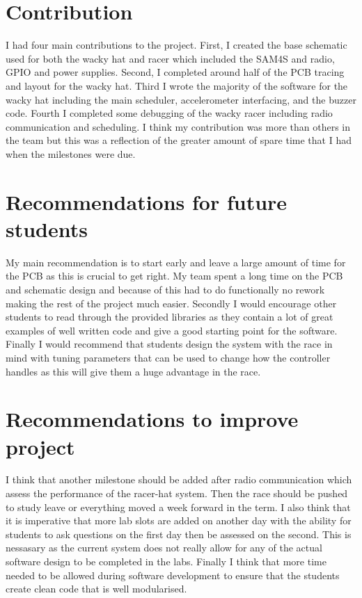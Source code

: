 \documentclass[a4paper,12pt]{article}
\begin{document}
\section{Contribution}

I had four main contributions to the project. First, I created the base schematic used for both the wacky hat and racer which included the SAM4S and radio, GPIO and power supplies. Second, I completed around half of the PCB tracing and layout for the wacky hat. Third I wrote the majority of the software for the wacky hat including the main scheduler, accelerometer interfacing, and the buzzer code. Fourth I completed some debugging of the wacky racer including radio communication and scheduling. I think my contribution was more than others in the team but this was a reflection of the greater amount of spare time that I had when the milestones were due.


\section{Recommendations for future students}

My main recommendation is to start early and leave a large amount of time for the PCB as this is crucial to get right. My team spent a long time on the PCB and schematic design and because of this had to do functionally no rework making the rest of the project much easier. Secondly I would encourage other students to read through the provided libraries as they contain a lot of great examples of well written code and give a good starting point for the software. Finally I would recommend that students design the system with the race in mind with tuning parameters that can be used to change how the controller handles as this will give them a huge advantage in the race.

\section{Recommendations to improve project}

I think that another milestone should be added after radio communication which assess the performance of the racer-hat system. Then the race should be pushed to study leave or everything moved a week forward in the term. I also think that it is imperative that more lab slots are added on another day with the ability for students to ask questions on the first day then be assessed on the second. This is nessasary as the current system does not really allow for any of the actual software design to be completed in the labs. Finally I think that more time needed to be allowed during software development to ensure that the students create clean code that is well modularised. 
\end{document}
